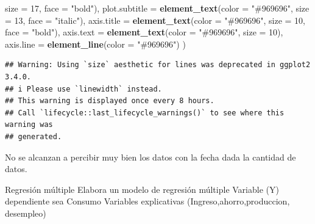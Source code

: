\documentclass[
]{article}
\newenvironment{Shaded}{\begin{snugshade}}{\end{snugshade}}
\newcommand{\AttributeTok}[1]{\textcolor[rgb]{0.13,0.29,0.53}{#1}}
\newcommand{\CommentTok}[1]{\textcolor[rgb]{0.56,0.35,0.01}{\textit{#1}}}
\newcommand{\DecValTok}[1]{\textcolor[rgb]{0.00,0.00,0.81}{#1}}
\newcommand{\FunctionTok}[1]{\textcolor[rgb]{0.13,0.29,0.53}{\textbf{#1}}}
\newcommand{\NormalTok}[1]{#1}
\newcommand{\OtherTok}[1]{\textcolor[rgb]{0.56,0.35,0.01}{#1}}
\newcommand{\SpecialCharTok}[1]{\textcolor[rgb]{0.81,0.36,0.00}{\textbf{#1}}}
\newcommand{\StringTok}[1]{\textcolor[rgb]{0.31,0.60,0.02}{#1}}
\begin{document}
\begin{Shaded}
\begin{Highlighting}[]
                              \AttributeTok{size =} \DecValTok{17}\NormalTok{,}
                              \AttributeTok{face =} \StringTok{"bold"}\NormalTok{),}
    \AttributeTok{plot.subtitle =} \FunctionTok{element\_text}\NormalTok{(}\AttributeTok{color =} \StringTok{"\#969696"}\NormalTok{, }\AttributeTok{size =} \DecValTok{13}\NormalTok{, }\AttributeTok{face =} \StringTok{"italic"}\NormalTok{),}
    \AttributeTok{axis.title =} \FunctionTok{element\_text}\NormalTok{(}\AttributeTok{color =} \StringTok{"\#969696"}\NormalTok{,}
                              \AttributeTok{size =} \DecValTok{10}\NormalTok{,}
                              \AttributeTok{face =} \StringTok{"bold"}\NormalTok{),}
    \AttributeTok{axis.text =} \FunctionTok{element\_text}\NormalTok{(}\AttributeTok{color =} \StringTok{"\#969696"}\NormalTok{, }\AttributeTok{size =} \DecValTok{10}\NormalTok{),}
    \AttributeTok{axis.line =} \FunctionTok{element\_line}\NormalTok{(}\AttributeTok{color =} \StringTok{"\#969696"}\NormalTok{)}
\NormalTok{  )}
\end{Highlighting}
\end{Shaded}

\begin{verbatim}
## Warning: Using `size` aesthetic for lines was deprecated in ggplot2 3.4.0.
## i Please use `linewidth` instead.
## This warning is displayed once every 8 hours.
## Call `lifecycle::last_lifecycle_warnings()` to see where this warning was
## generated.
\end{verbatim}


No se alcanzan a percibir muy bien los datos con la fecha dada la
cantidad de datos.

Regresión múltiple Elabora un modelo de regresión múltiple Variable (Y)
dependiente sea Consumo Variables explicativas
(Ingreso,ahorro,produccion, desempleo)

\begin{Shaded}
\end{Shaded}
\end{document}
